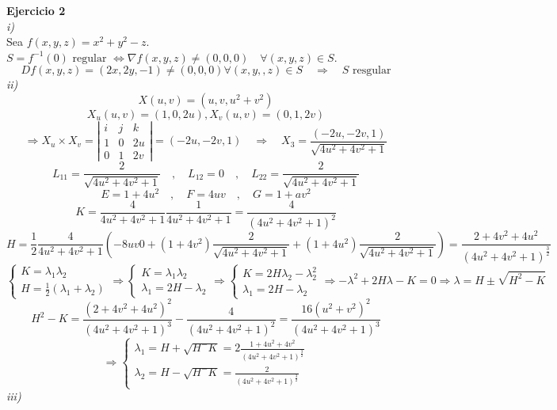 \documentclass{article}
\begin{document}
\textbf{Ejercicio 2}\\
\textit{i)}\\
Sea $f(x,y,z)=x^2+y^2-z$. $S=f^{-1}(0)\text{ regular }\Leftrightarrow \nabla f(x,y,z)\ne (0,0,0) \quad \forall (x,y,z)\in S$.
$$
Df(x,y,z)=(2x,2y,-1)\ne (0,0,0) \forall (x,y,,z)\in S \quad \Rightarrow \quad \text{$S$ resgular}
$$
\textit{ii)}\\
$$
X(u,v)=(u,v,u^2+v^2)
$$
$$
X_u(u,v)=(1,0,2u), X_v(u,v)=(0,1,2v)
$$
$$
\Rightarrow X_u \times X_v = \left|\begin{array}{ccc}
    i & j & k \\
    1 & 0 & 2u \\
    0 & 1 & 2v    
\end{array}\right| = (-2u,-2v,1) \quad \Rightarrow \quad X_3 = \frac{(-2u,-2v,1)}{\sqrt{4u^2+4v^2+1}}
$$
$$
L_{11} = \frac{2}{\sqrt{4u^2+4v^2+1}} \quad , \quad L_{12}=0 \quad , \quad L_{22}= \frac{2}{\sqrt{4u^2+4v^2+1}}
$$
$$
E = 1+4u^2 \quad , \quad F=4uv \quad , \quad G=1+av^2
$$
$$
K=\frac{4}{4u^2+4v^2+1}\frac{1}{4u^2+4v^2+1}=\frac{4}{(4u^2+4v^2+1)^2}
$$
$$
H = \frac{1}{2} \frac{4}{4u^2+4v^2+1} \left(-8uv0+(1+4v^2)\frac{2}{\sqrt{4u^2+4v^2+1}}+(1+4u^2)\frac{2}{\sqrt{4u^2+4v^2+1}}\right) = \frac{2+4v^2+4u^2}{(4u^2+4v^2+1)^{\frac{3}{2}}}
$$
$$
\left\{ \begin{array}{l}
    K = \lambda_1 \lambda_2\\
    H = \frac{1}{2}(\lambda_1+\lambda_2)
\end{array}\right. \Rightarrow
\left\{ \begin{array}{l}
    K = \lambda_1 \lambda_2\\
    \lambda_1 = 2H-\lambda_2
\end{array}\right. \Rightarrow
\left\{ \begin{array}{l}
    K = 2H\lambda_2 - \lambda_2^2\\
    \lambda_1 = 2H - \lambda_2
\end{array}\right. \Rightarrow -\lambda^2 + 2H\lambda - K = 0 \Rightarrow \lambda = H \pm \sqrt{H^2-K}
$$
$$
H^2-K = \frac{(2+4v^2+4u^2)^2}{(4u^2+4v^2+1)^3}-\frac{4}{(4u^2+4v^2+1)^2}= \frac{16(u^2+v^2)^2}{(4u^2+4v^2+1)^3}
$$
$$
\Rightarrow \left\{ \begin{array}{l}
    \lambda_1 = H + \sqrt{H^-K} = 2 \frac{1+4u^2+4v^2}{(4u^2+4v^2+1)^{\frac{3}{2}}}\\
    \lambda_2 = H - \sqrt{H^-K} = \frac{2}{(4u^2+4v^2+1)^{\frac{3}{2}}}
\end{array}\right.
$$
\textit{iii)}\\
\end{document}
